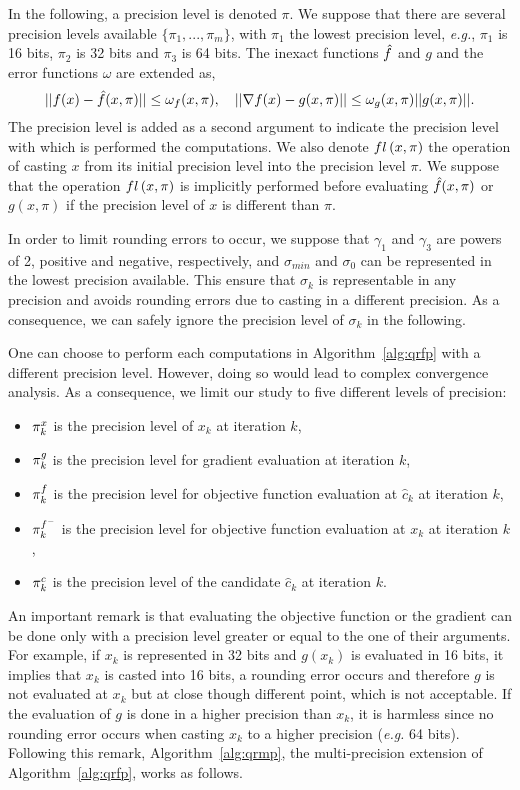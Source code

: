 \documentclass{article}[12pt]
\begin{document}
	In the following, a precision level is denoted $\pi$. We suppose that there are several precision levels available $\{\pi_1,...,\pi_m\}$, with $\pi_1$ the lowest precision level, \emph{e.g.}, $\pi_1$ is 16 bits, $\pi_2$ is 32 bits and $\pi_3$ is 64 bits. The inexact functions $\hat{f}$ and $g$ and the error functions $\omega$ are extended as,
	\begin{equation}
		\label{eq:fgerr_mp}
		||f(x)-\hat{f}(x,\pi)||\leq \omega_f(x,\pi), \quad ||\nabla f(x)-g(x,\pi)||\leq \omega_g(x,\pi)||g(x,\pi)||.
	\end{equation}
	The precision level is added as a second argument to indicate the precision level with which is performed the computations. We also denote $fl\left(x,\pi\right)$ the operation of casting $x$ from its initial precision level into the precision level $\pi$. We suppose that the operation $fl\left(x,\pi\right)$ is implicitly performed before evaluating $\hat{f}(x,\pi)$ or $g(x,\pi)$ if the precision level of $x$ is different than $\pi$.
	
	In order to limit rounding errors to occur, we suppose that $\gamma_1$ and $\gamma_3$ are powers of 2, positive and negative, respectively, and $\sigma_{min}$ and $\sigma_0$ can be represented in the lowest precision available. This ensure that $\sigma_k$ is representable in any precision and avoids rounding errors due to casting in a different precision. As a consequence, we can safely ignore the precision level of $\sigma_k$ in the following.
	
	One can choose to perform each computations in Algorithm~\ref{alg:qrfp} with a different precision level. However, doing so would lead to complex convergence analysis. As a consequence, we limit our study to five different levels of precision:
	\begin{itemize}
		\item $\pi_{k}^x$ is the precision level of $x_k$ at iteration $k$,
		\item $\pi_{k}^g$ is the precision level for gradient evaluation at iteration $k$,
		\item $\pi_{k}^f$ is the precision level for objective function evaluation at $\hat{c}_k$ at iteration $k$,
		\item $\pi_{k}^{f^-}$ is the precision level for objective function evaluation at $x_k$ at iteration $k$,
		\item $\pi_{k}^c$ is the precision level of the candidate $\hat{c}_k$ at iteration $k$.
	\end{itemize} 
	
	
	An important remark is that evaluating the objective function or the gradient can be done only with a precision level greater or equal to the one of their arguments. For example, if $x_k$ is represented in 32 bits and $g(x_k)$ is evaluated in 16 bits, it implies that $x_k$ is casted into 16 bits, a rounding error occurs and therefore $g$ is not evaluated at $x_k$ but at close though different point, which is not acceptable. If the evaluation of $g$ is done in a higher precision than $x_k$, it is harmless since no rounding error occurs when casting $x_k$ to a higher precision (\emph{e.g.} 64 bits). Following this remark, Algorithm~\ref{alg:qrmp}, the multi-precision extension of Algorithm~\ref{alg:qrfp}, works as follows.
	
\end{document}
